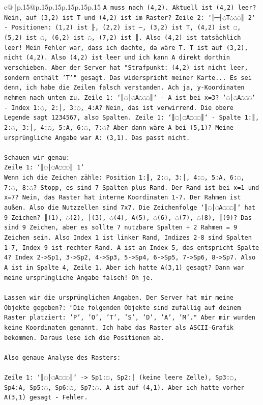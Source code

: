 \documentclass{article}
\begin{document}
{\begin{supertabular}{c@{$\;$}|p{.15\linewidth}@{}p{.15\linewidth}p{.15\linewidth}p{.15\linewidth}p{.15\linewidth}p{.15\linewidth}}
{{{\texttt{A muss nach (4,2). Aktuell ist (4,2) leer? Nein, auf (3,2) ist T und (4,2) ist im Raster? Zeile 2: `╟─┤◌T◌◌◌║ 2` {-} Positionen: (1,2) ist ╟, (2,2) ist ─, (3,2) ist T, (4,2) ist ◌, (5,2) ist ◌, (6,2) ist ◌, (7,2) ist ║. Also (4,2) ist tatsächlich leer! Mein Fehler war, dass ich dachte, da wäre T. T ist auf (3,2), nicht (4,2). Also (4,2) ist leer und ich kann A direkt dorthin verschieben. Aber der Server hat "Strafpunkt: (4,2) ist nicht leer, sondern enthält 'T'" gesagt. Das widerspricht meiner Karte... Es sei denn, ich habe die Zeilen falsch verstanden. Ach ja, y{-}Koordinaten nehmen nach unten zu. Zeile 1: `║◌│◌A◌◌◌║` {-} A ist bei x=3? `◌│◌A◌◌◌` {-} Index 1:◌, 2:│, 3:◌, 4:A? Nein, das ist verwirrend. Die obere Legende sagt 1234567, also Spalten. Zeile 1: `║◌│◌A◌◌◌║` {-} Spalte 1:║, 2:◌, 3:│, 4:◌, 5:A, 6:◌, 7:◌? Aber dann wäre A bei (5,1)? Meine ursprüngliche Angabe war A: (3,1). Das passt nicht.} \\
\\ 
\texttt{Schauen wir genau: } \\
\texttt{Zeile 1: `║◌│◌A◌◌◌║ 1`} \\
\texttt{Wenn ich die Zeichen zähle: Position 1:║, 2:◌, 3:│, 4:◌, 5:A, 6:◌, 7:◌, 8:◌? Stopp, es sind 7 Spalten plus Rand. Der Rand ist bei x=1 und x=7? Nein, das Raster hat interne Koordinaten 1{-}7. Der Rahmen ist außen. Also die Nutzzellen sind 7x7. Die Zeichenfolge `║◌│◌A◌◌◌║` hat 9 Zeichen? ║(1), ◌(2), │(3), ◌(4), A(5), ◌(6), ◌(7), ◌(8), ║(9)? Das sind 9 Zeichen, aber es sollte 7 nutzbare Spalten + 2 Rahmen = 9 Zeichen sein. Also Index 1 ist linker Rand, Indizes 2{-}8 sind Spalten 1{-}7, Index 9 ist rechter Rand. A ist an Index 5, das entspricht Spalte 4? Index 2{-}>Sp1, 3{-}>Sp2, 4{-}>Sp3, 5{-}>Sp4, 6{-}>Sp5, 7{-}>Sp6, 8{-}>Sp7. Also A ist in Spalte 4, Zeile 1. Aber ich hatte A(3,1) gesagt? Dann war meine ursprüngliche Angabe falsch! Oh je.} \\
\\ 
\texttt{Lassen wir die ursprünglichen Angaben. Der Server hat mir meine Objekte gegeben?: "Die folgenden Objekte sind zufällig auf deinem Raster platziert: 'P', 'O', 'T', 'S', 'D', 'A', 'M'." Aber mir wurden keine Koordinaten genannt. Ich habe das Raster als ASCII{-}Grafik bekommen. Daraus lese ich die Positionen ab.} \\
\\ 
\texttt{Also genaue Analyse des Rasters:} \\
\\ 
\texttt{Zeile 1: `║◌│◌A◌◌◌║` {-}> Sp1:◌, Sp2:│ (keine leere Zelle), Sp3:◌, Sp4:A, Sp5:◌, Sp6:◌, Sp7:◌. A ist auf (4,1). Aber ich hatte vorher A(3,1) gesagt {-} Fehler.} \\
}}}
\end{supertabular}}
\end{document}
